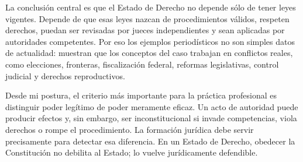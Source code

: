 \documentclass[
	spanish,
	letterpaper, oneside
]{article}
\begin{document}
La conclusión central es que el Estado de Derecho no depende sólo de tener leyes vigentes. Depende de que esas leyes nazcan de procedimientos válidos, respeten derechos, puedan ser revisadas por jueces independientes y sean aplicadas por autoridades competentes. Por eso los ejemplos periodísticos no son simples datos de actualidad: muestran que los conceptos del caso trabajan en conflictos reales, como elecciones, fronteras, fiscalización federal, reformas legislativas, control judicial y derechos reproductivos.

Desde mi postura, el criterio más importante para la práctica profesional es distinguir poder legítimo de poder meramente eficaz. Un acto de autoridad puede producir efectos y, sin embargo, ser inconstitucional si invade competencias, viola derechos o rompe el procedimiento. La formación jurídica debe servir precisamente para detectar esa diferencia. En un Estado de Derecho, obedecer la Constitución no debilita al Estado; lo vuelve jurídicamente defendible.


\end{document}
